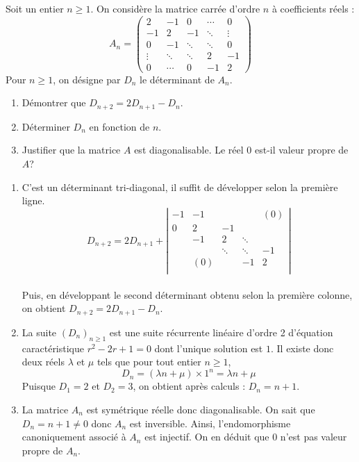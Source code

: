\documentclass[a4paper,10pt]{report}
\begin{document}
\begin{Exercice}{} Soit un entier $n\geq 1.$ On consid\`{e}re la matrice carr\'{e}e d'ordre $n$ \`{a} coefficients r\'{e}els :
\begin{equation*}
A_n=\begin{pmatrix}
2 & -1 & 0 & \cdots & 0 \\ 
-1 & 2 & -1 & \ddots & \vdots \\ 
0 & -1 & \ddots & \ddots & 0 \\ 
\vdots & \ddots & \ddots & 2 & -1 \\ 
0 & \cdots & 0 & -1 & 2
\end{pmatrix}
\end{equation*}
Pour $n\geq 1$, on d\'{e}signe par $D_{n}$ le d\'{e}terminant de $A_n$.
\begin{enumerate}
\item Démontrer que $D_{n+2}=2D_{n+1}-D_{n}$.
\item D\'{e}terminer $D_{n}$ en fonction de $n$.
\item Justifier que la matrice $A$ est diagonalisable. Le r\'{e}el $0$ est-il valeur propre de $A$?
\end{enumerate}
\end{Exercice}

\newpage

\corr \begin{enumerate}
\item
 C'est un déterminant tri-diagonal, il suffit de développer selon la première ligne.
$$D_{n+2}  = 2D_{n +1}  + \left| {
\begin{array}{lllll}
 { - 1} & { - 1} & {} & {} & {(0)}  \\
 0 & 2 & { - 1} & {} & {}  \\
 {} & { - 1} & 2 &  \ddots  & {}  \\
 {} & {} &  \ddots  &  \ddots  & { - 1}  \\
 {} & {(0)} & {} & { - 1} & 2  \\
\end{array}
} \right|$$\\
Puis, en développant le second déterminant obtenu selon la première colonne, on obtient $D_{n+2}=2D_{n+1}-D_n$.
\item
La suite $(D_n)_{n \geq 1}$ est une suite récurrente linéaire d'ordre 2 d'équation caractéristique $r^2  - 2r + 1 = 0$ dont l'unique solution est $1$. Il existe donc deux réels $\lambda$ et $\mu$ tels que pour tout entier $n \geq 1$,
$$D_n  = (\lambda n + \mu ) \times 1^n= \lambda n + \mu$$
Puisque $D_1  = 2$ et $D_2  = 3$, on obtient après calculs :
$D_n  = n + 1$.
\item La matrice $A_n$ est symétrique réelle donc diagonalisable. 
On sait que $D_n=n+1\neq 0$ donc $A_n$ est inversible. Ainsi, l'endomorphisme canoniquement associé à $A_n$ est injectif.
On en déduit que $0$ n'est pas valeur propre de $A_n$.
\end{enumerate}
\end{document}
